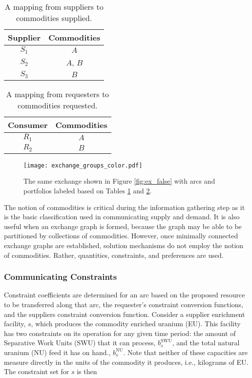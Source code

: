 \begin{table}[h]
\centering
\begin{tabular}{c|c}
Supplier & Commodities \\ \hline
$S_1$             & $A$         \\
$S_2$             & $A$, $B$    \\
$S_3$             & $B$         \\
\end{tabular}
\caption{A mapping from suppliers to commodities supplied.}
\label{tbl:ex_sup}
\end{table}

\begin{table}[h]
\centering
\begin{tabular}{c|c}
Consumer & Commodities \\ \hline
$R_1$             & $A$         \\
$R_2$             & $B$        
\end{tabular}
\caption{A mapping from requesters to commodities requested.}
\label{tbl:ex_req}
\end{table}

\begin{figure}
  \begin{center}
    \texttt{[image: exchange\_groups\_color.pdf]}
    \caption{The same exchange shown in Figure \ref{fig:ex_false} with arcs and
      portfolios labeled based on Tables \ref{tbl:ex_sup} and
      \ref{tbl:ex_req}. }
    \label{fig:ex_groups_color}
  \end{center}
\end{figure}

The notion of commodities is critical during the information gathering step as
it is the basic classification used in communicating supply and demand. It is
also useful when an exchange graph is formed, because the graph may be able to
be partitioned by collections of commodities. However, once minimally connected
exchange graphs are established, solution mechanisms do not employ the notion of
commodities. Rather, quantities, constraints, and preferences are used.

\subsubsection{Communicating Constraints}

Constraint coefficients are determined for an arc based on the proposed resource
to be transferred along that arc, the requester's constraint conversion
functions, and the suppliers constraint conversion function. Consider a supplier
enrichment facility, $s$, which produces the commodity enriched uranium
(EU). This facility has two constraints on its operation for any given time
period: the amount of Separative Work Units (SWU) that it can process,
$b_{s}^{\text{SWU}}$, and the total natural uranium (NU) feed it has on hand.,
$b_{s}^{\text{NU}}$.  Note that neither of these capacities are measure directly in the
units of the commodity it produces, i.e., kilograms of EU. The constraint set
for $s$ is then
 
